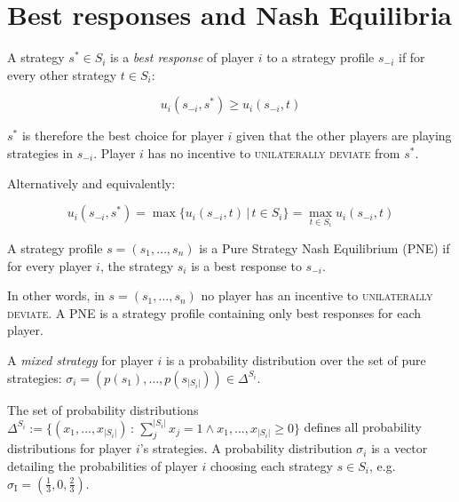 \section{Best responses and Nash Equilibria}

\begin{definition}
	A strategy $s^* \in S_i$ is a \textit{best response} of player $i$ to a
	strategy profile $s_{-i}$ if for every other strategy $t \in S_i$:

	\begin{equation}
		u_i(s_{-i}, s^*) \ge u_i(s_{-i}, t)
	\end{equation}
\end{definition}

$s^*$ is therefore the best choice for player $i$ given that the other players
are playing strategies in $s_{-i}$. Player $i$ has no incentive to
\textsc{unilaterally deviate} from $s^*$.

Alternatively and equivalently:

\begin{equation}
	u_i(s_{-i}, s^*) = \max \{ u_i(s_{-i}, t) \, | \, t \in S_i \} = \max_{t \in S_i} u_i(s_{-i}, t)
\end{equation}

\begin{definition}
	A strategy profile $s = (s_1, \ldots, s_n)$ is a Pure Strategy Nash
	Equilibrium (PNE) if for every player $i$, the strategy $s_i$ is a best
	response to $s_{-i}$.
\end{definition}

In other words, in $s = (s_1, \ldots, s_n)$ no player has an incentive to
\textsc{unilaterally deviate}. A PNE is a strategy profile containing only best
responses for each player.

\begin{definition}
	A \textit{mixed strategy} for player $i$ is a probability distribution over
	the set of pure strategies: $\sigma_i = (p(s_1), \ldots, p(s_{|S_i|})) \in
	\Delta^{S_i}$.
\end{definition}

The set of probability distributions $\Delta^{S_i} := \{ (x_1, \ldots,
x_{|S_i|} ) \, : \, \sum_j ^{|S_i|} x_j = 1 \land x_1, \ldots, x_{|S_i|} \ge 0
\}$ defines all probability distributions for player $i$'s strategies. A
probability distribution $\sigma_i$ is a vector detailing the probabilities of
player $i$ choosing each strategy $s \in S_i$, e.g. $\sigma_\text{I} =
(\frac{1}{3}, 0, \frac{2}{3})$.

